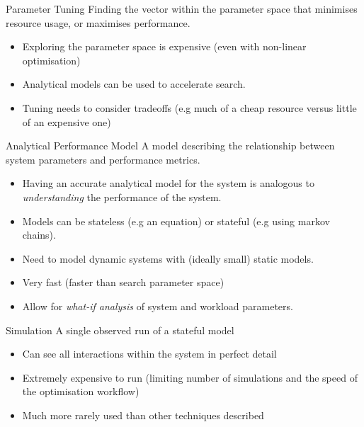 \begin{definitionbox}{Parameter Tuning}
    Finding the vector within the parameter space that minimises resource usage, or maximises performance.
    \begin{itemize}
        \item Exploring the parameter space is expensive (even with non-linear optimisation)
        \item Analytical models can be used to accelerate search.
        \item Tuning needs to consider tradeoffs (e.g much of a cheap resource versus little of an expensive one)
    \end{itemize}
\end{definitionbox}

\begin{definitionbox}{Analytical Performance Model}
    A model describing the relationship between system parameters and performance metrics.
    \begin{itemize}
        \item Having an accurate analytical model for the system is analogous to \textit{understanding} the performance of the system.
        \item Models can be stateless (e.g an equation) or stateful (e.g using markov chains).
        \item Need to model dynamic systems with (ideally small) static models.
        \item Very fast (faster than search parameter space)
        \item Allow for \textit{what-if analysis} of system and workload parameters.
    \end{itemize}
\end{definitionbox}

\begin{definitionbox}{Simulation}
    A single observed run of a stateful model
    \begin{itemize}
        \item Can see all interactions within the system in perfect detail
        \item Extremely expensive to run (limiting number of simulations and the speed of the optimisation workflow)
        \item Much more rarely used than other techniques described
    \end{itemize}
\end{definitionbox}

